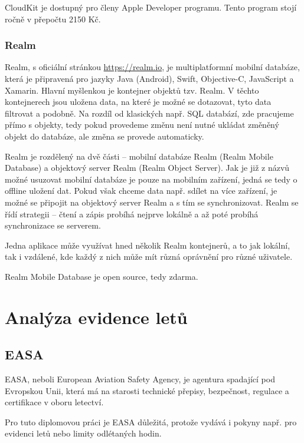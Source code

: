 \documentclass[thesis=M,czech]{FITthesis}[2012/06/26]
\begin{document}
CloudKit je dostupný pro členy Apple Developer programu. \cite{AppleDeveloperProgram} Tento program stojí ročně v přepočtu 2150 Kč. \cite{AppleDeveloperProgramPrice} 

\subsection{Realm}
Realm, s oficiální stránkou \url{https://realm.io}, je multiplatformní mobilní databáze, která je připravená pro jazyky Java (Android), Swift, Objective-C, JavaScript a Xamarin. Hlavní myšlenkou je kontejner objektů tzv. Realm. V těchto kontejnerech jsou uložena data, na které je možné se dotazovat, tyto data filtrovat a podobně. Na rozdíl od klasických např. SQL databází, zde pracujeme přímo s  objekty, tedy pokud provedeme změnu není nutné ukládat změněný objekt do databáze, ale změna se provede automaticky.

Realm je rozdělený na dvě části -- mobilní databáze Realm (Realm Mobile Database) a objektový server Realm (Realm Object Server). Jak je již z názvů možné usuzovat mobilní databáze je pouze na mobilním zařízení, jedná se tedy o offline uložení dat. Pokud však chceme data např. sdílet na více zařízení, je možné se připojit na objektový server Realm a s tím se synchronizovat. Realm se řídí strategii  -- čtení a zápis probíhá nejprve lokálně a až poté probíhá synchronizace se serverem.

Jedna aplikace může využívat hned několik Realm kontejnerů, a to jak lokální, tak i vzdálené, kde každý z nich může mít různá oprávnění pro různé uživatele.

Realm Mobile Database je open source, tedy zdarma. \cite{realmOverview}

\chapter{Analýza evidence letů}
\section{EASA}
EASA, neboli European Aviation Safety Agency, je agentura spadající pod Evropskou Unii, která má na starosti technické přepisy, bezpečnost, regulace a certifikace v oboru letectví. \cite{EU} 

Pro tuto diplomovou práci je EASA důležitá, protože vydává i pokyny např. pro evidenci letů nebo limity odlétaných hodin. \cite{EASARegulations}
\end{document}
